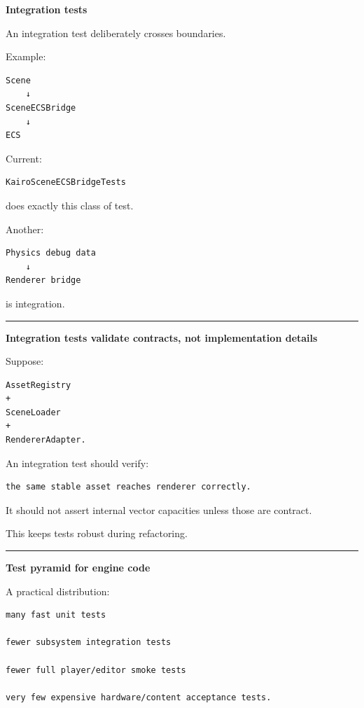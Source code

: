 \textbf{Integration tests}

An integration test deliberately crosses boundaries.

Example:

\begin{verbatim}
Scene
    ↓
SceneECSBridge
    ↓
ECS
\end{verbatim}

Current:

\begin{verbatim}
KairoSceneECSBridgeTests
\end{verbatim}

does exactly this class of test.

Another:

\begin{verbatim}
Physics debug data
    ↓
Renderer bridge
\end{verbatim}

is integration.

\begin{center}\rule{0.5\linewidth}{0.5pt}\end{center}

\textbf{Integration tests validate contracts, not implementation details}

Suppose:

\begin{verbatim}
AssetRegistry
+
SceneLoader
+
RendererAdapter.
\end{verbatim}

An integration test should verify:

\begin{verbatim}
the same stable asset reaches renderer correctly.
\end{verbatim}

It should not assert internal vector capacities unless those are contract.

This keeps tests robust during refactoring.

\begin{center}\rule{0.5\linewidth}{0.5pt}\end{center}

\textbf{Test pyramid for engine code}

A practical distribution:

\begin{verbatim}
many fast unit tests

fewer subsystem integration tests

fewer full player/editor smoke tests

very few expensive hardware/content acceptance tests.
\end{verbatim}

